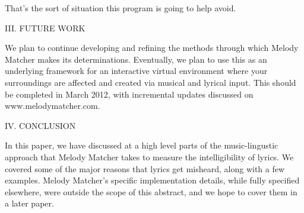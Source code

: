 \documentclass{article}
\begin{document}
{\large That's the sort of situation this program is going to help avoid.}

{\large III. FUTURE WORK}

{\large We plan to continue developing and refining the methods through which Melody 
Matcher makes its determinations. Eventually, we plan to use this as an underlying 
framework for an interactive virtual environment where your surroundings are affected 
and created via musical and lyrical input. This should be completed in March 2012, 
with incremental updates discussed on www.melodymatcher.com.}

{\large IV. CONCLUSION}

{\large In this paper, we have discussed at a high level parts of the music-lingustic 
approach that Melody Matcher takes to measure the intelligibility of lyrics. We 
covered some of the major reasons that lyrics get misheard, along with a few examples. 
Melody Matcher's specific implementation details, while fully specified elsewhere, 
were outside the scope of this abstract, and we hope to cover them in a later paper.}
\end{document}
